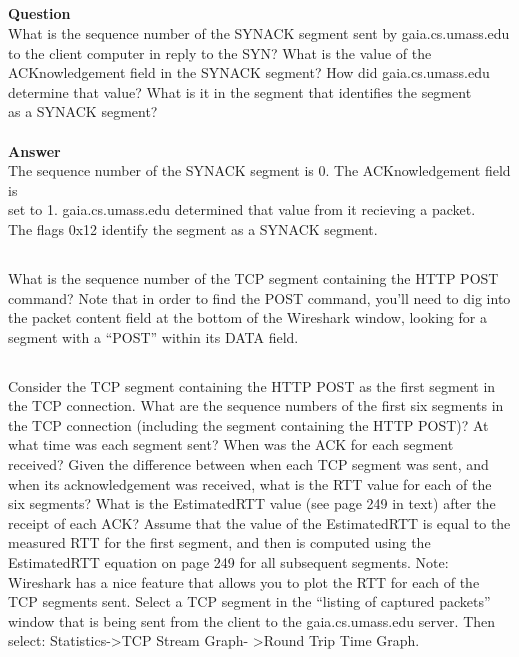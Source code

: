 \documentclass[12pt,letterpaper]{article}
\begin{document}
\tiny

\normalsize

\subsection{}
\textbf{Question}\\
What is the sequence number of the SYNACK segment sent by gaia.cs.umass.edu
to the client computer in reply to the SYN? What is the value of the
ACKnowledgement field in the SYNACK segment? How did gaia.cs.umass.edu
determine that value? What is it in the segment that identifies the segment \\
as a SYNACK segment?\\\\
\noindent\textbf{Answer}\\
The sequence number of the SYNACK segment is 0. The ACKnowledgement field is \\
set to 1. gaia.cs.umass.edu determined that value from it recieving a packet.\\
The flags 0x12 identify the segment as a SYNACK segment.

\tiny

\normalsize

\subsection{}
What is the sequence number of the TCP segment containing the HTTP POST
command? Note that in order to find the POST command, you’ll need to dig into
the packet content field at the bottom of the Wireshark window, looking for a
segment with a “POST” within its DATA field.

\subsection{}
Consider the TCP segment containing the HTTP POST as the first segment in the
TCP connection. What are the sequence numbers of the first six segments in the
TCP connection (including the segment containing the HTTP POST)? At what
time was each segment sent? When was the ACK for each segment received?
Given the difference between when each TCP segment was sent, and when its
acknowledgement was received, what is the RTT value for each of the six
segments? What is the EstimatedRTT value (see page 249 in text) after the
receipt of each ACK? Assume that the value of the EstimatedRTT is equal to
the measured RTT for the first segment, and then is computed using the
EstimatedRTT equation on page 249 for all subsequent segments.
Note: Wireshark has a nice feature that allows you to plot the RTT for
each of the TCP segments sent. Select a TCP segment in the “listing of
captured packets” window that is being sent from the client to the
gaia.cs.umass.edu server. Then select: Statistics->TCP Stream Graph-
>Round Trip Time Graph.
\end{document}
